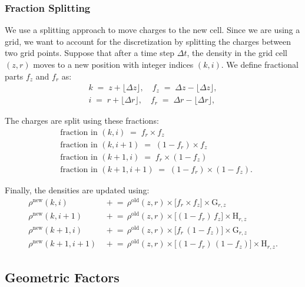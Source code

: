 \subsubsection*{Fraction Splitting}\label{ch3:sec:frac_split}
We use a splitting approach to move charges to the new cell. Since we are using a grid, we want to account for the discretization by splitting the charges between two grid points. Suppose that after a time step $\Delta t$, the density in the grid cell $(z,r)$ moves to a new position with integer indices $(k,i)$. We define fractional parts $f_z$ and $f_r$ as:
%
\begin{align}
k \;=\; z + \lfloor \Delta z \rfloor,\quad
f_z \;=\; \Delta z - \lfloor \Delta z \rfloor,\\
i \;=\; r + \lfloor \Delta r \rfloor,\quad
f_r \;=\; \Delta r - \lfloor \Delta r \rfloor,
\end{align}


The charges are split using these fractions:
\begin{align}
&\text{fraction in }(k, i)   \;=\; f_{r} \times f_{z} \\
&\text{fraction in }(k, i+1) \;=\; (1 - f_{r}) \times f_{z}\\
&\text{fraction in }(k+1, i) \;=\; f_{r} \times (1 - f_{z})\\
&\text{fraction in }(k+1, i+1)\;=\; (1 - f_{r}) \times (1 - f_{z}).
\label{eq:bilinear-fractions}
\end{align}

Finally, the densities are updated using:
\begin{align}
\rho^{\mathrm{new}}(k,i)   &\,\mathrel{+}=\, \rho^{\mathrm{old}}(z,r)\times \bigl[f_{r}\times f_{z}\bigr] \times \text{G}_{r,z} \label{ch3:eq:den_update_1} \\
\rho^{\mathrm{new}}(k,i+1) &\,\mathrel{+}=\, \rho^{\mathrm{old}}(z,r)\times \bigl[(1 - f_{r})\,f_{z}\bigr] \times \text{H}_{r,z} \label{ch3:eq:den_update_2} \\
\rho^{\mathrm{new}}(k+1,i) &\,\mathrel{+}=\, \rho^{\mathrm{old}}(z,r)\times \bigl[f_{r}\,(1 - f_{z})\bigr] \times \text{G}_{r,z} \label{ch3:eq:den_update_3} \\
\rho^{\mathrm{new}}(k+1,i+1)&\,\mathrel{+}=\, \rho^{\mathrm{old}}(z,r)\times \bigl[(1 - f_{r})\,(1 - f_{z})\bigr] \times \text{H}_{r,z}. \label{ch3:eq:den_update_4}
\end{align}
\subsection{Geometric Factors}
\label{sec:geom-factor}

